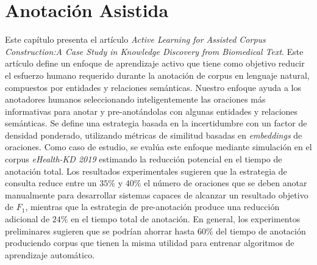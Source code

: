 
\chapter[Anotación Asistida: \textit{Active Learning for Assisted Corpus Construction:A Case Study in Knowledge Discovery from Biomedical Text}]{Anotación Asistida}
\label{Chap:Annotation}

Este capítulo presenta el artículo \textit{Active Learning for Assisted Corpus Construction:A Case Study in Knowledge Discovery from Biomedical Text}.
Este artículo define un enfoque de aprendizaje activo que tiene como objetivo reducir el esfuerzo humano requerido durante la anotación de corpus en lenguaje natural, compuestos por entidades y relaciones semánticas. Nuestro enfoque ayuda a los anotadores humanos seleccionando inteligentemente las oraciones más informativas para anotar y pre-anotándolas con algunas entidades y relaciones semánticas. Se define una estrategia basada en la incertidumbre con un factor de densidad ponderado, utilizando métricas de similitud basadas en \textit{embeddings} de oraciones. Como caso de estudio, se evalúa este enfoque mediante simulación en el corpus \textit{eHealth-KD 2019} estimando la reducción potencial en el tiempo de anotación total. Los resultados experimentales sugieren que la estrategia de consulta reduce entre un $35\%$ y $40\%$ el número de oraciones que se deben anotar manualmente para desarrollar sistemas capaces de alcanzar un resultado objetivo de $F_1$,
mientras que la estrategia de pre-anotación produce una reducción adicional de $24\%$ en el tiempo total de anotación. En general, los experimentos preliminares sugieren que se podrían ahorrar hasta $60\%$ del tiempo de anotación produciendo corpus que tienen la misma utilidad para entrenar algoritmos de aprendizaje automático.
